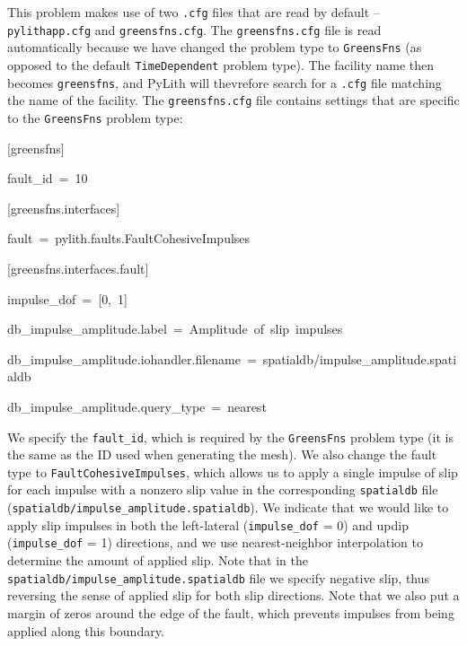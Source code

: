 This problem makes use of two \texttt{.cfg} files that are read by
default -- \texttt{pylithapp.cfg} and \texttt{greensfns.cfg}. The
\texttt{greensfns.cfg} file is read automatically because we have
changed the problem type to \texttt{GreensFns} (as opposed to the
default \texttt{TimeDependent} problem type). The facility name then
becomes \texttt{greensfns}, and PyLith will thevrefore search for a
\texttt{.cfg} file matching the name of the facility. The \texttt{greensfns.cfg}
file contains settings that are specific to the \texttt{GreensFns}
problem type:
\begin{lyxcode}
{[}greensfns{]}

fault\_id~=~10



{[}greensfns.interfaces{]}

fault~=~pylith.faults.FaultCohesiveImpulses



{[}greensfns.interfaces.fault{]}

impulse\_dof~=~{[}0,~1{]}

db\_impulse\_amplitude.label~=~Amplitude~of~slip~impulses

db\_impulse\_amplitude.iohandler.filename~=~spatialdb/impulse\_amplitude.spatialdb

db\_impulse\_amplitude.query\_type~=~nearest~
\end{lyxcode}
We specify the \texttt{fault\_id}, which is required by the \texttt{GreensFns}
problem type (it is the same as the ID used when generating the mesh).
We also change the fault type to \texttt{FaultCohesiveImpulses}, which
allows us to apply a single impulse of slip for each impulse with
a nonzero slip value in the corresponding \texttt{spatialdb} file
(\texttt{spatialdb/impulse\_amplitude.spatialdb}). We indicate that
we would like to apply slip impulses in both the left-lateral (\texttt{impulse\_dof}
= 0) and updip (\texttt{impulse\_dof} = 1) directions, and we use
nearest-neighbor interpolation to determine the amount of applied
slip. Note that in the \texttt{spatialdb/impulse\_amplitude.spatialdb}
file we specify negative slip, thus reversing the sense of applied
slip for both slip directions. Note that we also put a margin of zeros
around the edge of the fault, which prevents impulses from being applied
along this boundary.

